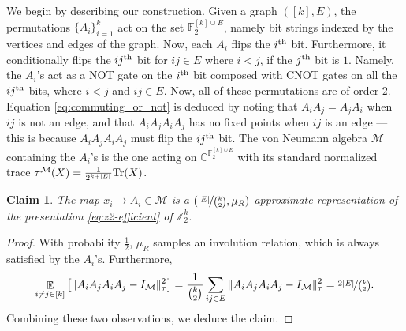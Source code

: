 \documentclass[11pt]{article}
\newtheorem{claim}[theorem]{Claim}
\theoremstyle{definition}
\newcommand{\Tr}{\mbox{\rm Tr}}
\newcommand{\Id}{\ensuremath{I}}
\DeclareMathOperator*{\Expectation}{\mathbb{E}}
\newcommand{\field}{\mathbb{F}_2}
\newcommand{\complex}{\ensuremath{\mathbb{C}}}
\newcommand{\Z}{\ensuremath{\mathbb{Z}}}
\newcommand{\mM}{\ensuremath{\mathcal{M}}}
\newcommand{\cM}{\ensuremath{\mathcal{M}}}
\begin{document}
We begin by describing our construction. Given a graph $([k],E)$, the permutations $\{A_i\}_{i=1}^k$ act on  the set $\field^{[k]\cup E}$, namely bit strings  indexed by the vertices and edges of the graph. Now, each $A_i$ flips the $i^{\rm th}$ bit. Furthermore, it conditionally flips the  $ij^{\rm th}$  bit for $ij\in E$ where $i<j$, if the $j^{\rm th}$ bit is $1$. Namely, the $A_i$'s act as a NOT gate on the $i^{\rm th}$ bit composed with CNOT gates on all the $ij^{\rm th}$ bits, where $i<j$ and $ij\in E$. Now, all of these permutations are of order $2$. Equation \eqref{eq:commuting_or_not} is deduced by noting that  $A_iA_j=A_jA_i$ when $ij$ is not an edge, and that $A_iA_jA_iA_j$ has no fixed points when $ij$ is an edge --- this is because $A_iA_jA_iA_j$ must flip the $ij^{\rm th}$ bit.  
The von Neumann algebra $\mM$ containing the $A_i$'s is the one acting on $\complex^{\field^{[k]\cup E}}$ with its standard normalized trace $\tau^\cM(X)=\frac{1}{2^{k+|E|}}\Tr(X)$.

\begin{claim}
    The map $x_i\mapsto A_i\in \cM$ is a $(\nicefrac{|E|}{\binom{k}{2}},\mu_R)$-approximate representation of the presentation \eqref{eq:z2-efficient} of $\Z_2^k$.
\end{claim}

\begin{proof}
    With probability $\frac{1}{2}$, $\mu_R$ samples an involution relation, which is always satisfied by the  $A_i$'s. Furthermore, 
    \[
\Expectation_{i\neq j\in [k]}\left[\Vert A_iA_jA_iA_j-\Id_\mM\Vert_\tau^2\right]=\frac{1}{\binom{k}{2}}\sum_{ij\in E}\Vert A_iA_jA_iA_j-\Id_\mM\Vert_\tau^2=\nicefrac{2|E|}{\binom{k}{2}}.
\]
Combining these two observations, we deduce the claim.
\end{proof}
\end{document}
